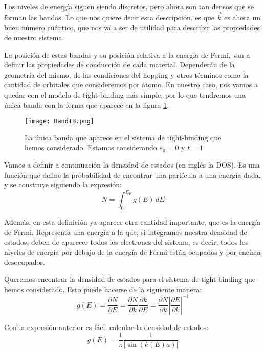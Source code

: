 \documentclass[12pt,twoside]{article}
\begin{document}
Los niveles de energía siguen siendo discretos, pero ahora son tan densos que se forman las bandas. Lo que nos quiere decir esta descripción, es que $\vec{k}$ es ahora un buen número cuántico, que nos va a ser de utilidad para describir las propiedades de nuestro sistema.

La posición de estas bandas y su posición relativa a la energía de Fermi, van a definir las propiedades de conducción de cada material.  Dependerán de la geometría del mismo,  de las condiciones del hopping y otros términos como la cantidad de orbitales que consideremos por átomo. En nuestro caso, nos vamos a quedar con el modelo de tight-binding más simple, por lo que tendremos una única banda con la forma que aparece en la figura \ref{fig:bandaTB}.
\begin{figure}[h!]
  \begin{center}
    \texttt{[image: BandTB.png]}
    \caption{La única banda que aparece en el sistema de tight-binding que hemos considerado. Estamos considerando $\varepsilon_0 = 0$ y $t = 1$.}
    \label{fig:bandaTB}
  \end{center}
\end{figure}

Vamos a definir a continuación la densidad de estados (en inglés la DOS). Es una función que define la probabilidad de encontrar una partícula a una energía dada, y se construye siguiendo la expresión:
\begin{equation}
  N = \int_0^{E_F} g(E) \, dE
\end{equation}

Además, en esta definición ya aparece otra cantidad importante, que es la energía de Fermi. Representa una energía a la que, si integramos nuestra densidad de estados, deben de aparecer todos los electrones del sistema, es decir, todos los niveles de energía por debajo de la energía de Fermi están ocupados y por encima desocupados.

Queremos encontrar la densidad de estados para el sistema de tight-binding que hemos considerado. Esto puede hacerse de la siguiente manera:
$$
g(E) = \frac{\partial N}{\partial E} = \frac{\partial N}{\partial k}\frac{\partial k}{\partial E} = \frac{\partial N}{\partial k}\left|\frac{\partial E}{\partial k}\right|^{-1}
$$

Con la expresión anterior es fácil calcular la densidad de estados:
\begin{equation}
  g(E) = \frac{1}{\pi}\frac{1}{|\sin(k(E)a)|}
\end{equation}
\end{document}
